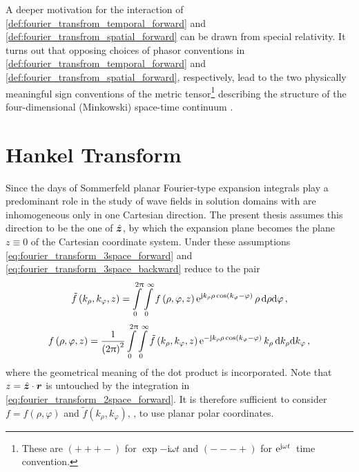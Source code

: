 A deeper motivation for the interaction of
\cref{def:fourier_transfrom_temporal_forward} and 
\cref{def:fourier_transfrom_spatial_forward} can be drawn from special
relativity.
It turns out that opposing choices of phasor conventions in
\cref{def:fourier_transfrom_temporal_forward} and
\cref{def:fourier_transfrom_spatial_forward}, respectively, lead to the two
physically meaningful sign conventions of the metric tensor\footnote{
	These are $\left( + + + - \right)$ for $\exp{-\mathrm{i} \omega t}$
	and $\left( - - - + \right)$ for $\mathrm{e}^{\mathrm{j} \omega t}\,$ time convention.}
describing the structure of the four-dimensional (Minkowski) space-time
continuum \cite[624]{Jackson2013}\cite{Kaiser2016}.









\section{Hankel Transform}
\label{sec:hankel_transform}

Since the days of Sommerfeld \cite{Sommerfeld1909} planar Fourier-type expansion
integrals play a predominant role in the study of wave fields in solution
domains with are inhomogeneous only in one Cartesian direction.
The present thesis assumes this direction to be the one of $\uv{z}$,
by which the expansion plane becomes the plane $z \equiv 0$ of the
Cartesian coordinate system.
Under these assumptions \eqref{eq:fourier_transform_3space_forward}
and \eqref{eq:fourier_transform_3space_backward} reduce to the pair
\begin{equation}\label{eq:fourier_transform_2space_forward}
	\tilde{f} \left(k_\rho, k_\varphi, z\right) = 
	\int\limits_{0}^{2\uppi}  
	\int\limits_{0}^{\infty}
	f \left(\rho, \varphi, z\right)
	\mathrm{e}^{\mathrm{j} k_\rho \rho \cos \left(k_\varphi - \varphi\right)}\,
	\rho \,
	\mathrm{d} \rho
	\mathrm{d} \varphi
	\, ,
\end{equation}
\begin{equation}\label{eq:fourier_transform_2space_backward}
	f \left(\rho, \varphi, z\right) = 
	\frac{1}{\left(2\uppi\right)^2}
	\int\limits_{0}^{2\uppi} 
	\int\limits_{0}^{\infty} 
	\tilde{f} \left(k_\rho, k_\varphi, z\right)
	\mathrm{e}^{-\mathrm{j} k_\rho \rho \cos \left(k_\varphi - \varphi\right)}\,
	k_\rho \,
	\mathrm{d} k_\rho
	\mathrm{d} k_\varphi
	\, ,
\end{equation}
where the geometrical meaning of the dot product is incorporated.
Note that $z = \uv{z} \cdot \pvec{r}$ is untouched by the integration in
\eqref{eq:fourier_transform_2space_forward}.
It is therefore sufficient to consider $f = f\left(\rho, \varphi\right)$
and $\tilde{f} \left(k_\rho, k_\varphi\right)$, \ie, to use planar polar
coordinates.

